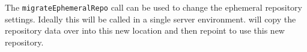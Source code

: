 The \verb+migrateEphemeralRepo+ call can be used to change the ephemeral repository settings. Ideally this will be
called in a single server environment. \Rapture will copy the repository data over into this new location and then
repoint to use this new repository.
